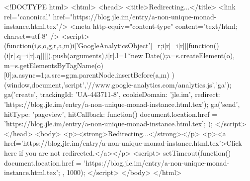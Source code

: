 <!DOCTYPE html>
<html>
<head>
<title>Redirecting...</title>
<link rel="canonical" href="https://blog.jle.im/entry/a-non-unique-monad-instance.html.tex"/>
<meta http-equiv="content-type" content="text/html; charset=utf-8" />
<script>
(function(i,s,o,g,r,a,m){i['GoogleAnalyticsObject']=r;i[r]=i[r]||function(){
(i[r].q=i[r].q||[]).push(arguments)},i[r].l=1*new Date();a=s.createElement(o),
m=s.getElementsByTagName(o)[0];a.async=1;a.src=g;m.parentNode.insertBefore(a,m)
})(window,document,'script','//www.google-analytics.com/analytics.js','ga');
ga('create', { trackingId: 'UA-443711-8', cookieDomain: 'jle.im', redirect: 'https://blog.jle.im/entry/a-non-unique-monad-instance.html.tex'});
ga('send', { hitType: 'pageview', hitCallback: function() { document.location.href = 'https://blog.jle.im/entry/a-non-unique-monad-instance.html.tex'; } });
</script>
</head>
<body>
  <p><strong>Redirecting...</strong></p>
  <p><a href='https://blog.jle.im/entry/a-non-unique-monad-instance.html.tex'>Click here if you are not redirected.</a></p>
  <script>
    setTimeout(function() { document.location.href = 'https://blog.jle.im/entry/a-non-unique-monad-instance.html.tex'; }, 1000);
  </script>
</body>
</html>
